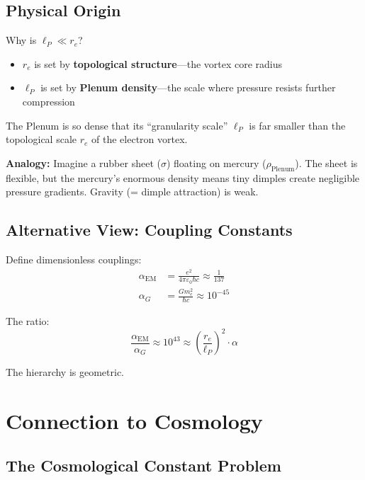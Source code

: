 \subsection{Physical Origin}

Why is $\ell_P \ll r_e$?

\begin{itemize}
    \item $r_e$ is set by \textbf{topological structure}—the vortex core radius
    \item $\ell_P$ is set by \textbf{Plenum density}—the scale where pressure resists further compression
\end{itemize}

The Plenum is so dense that its ``granularity scale'' $\ell_P$ is far smaller than the topological scale $r_e$ of the electron vortex.

\textbf{Analogy:} Imagine a rubber sheet ($\sigma$) floating on mercury ($\rho_{\text{Plenum}}$). The sheet is flexible, but the mercury's enormous density means tiny dimples create negligible pressure gradients. Gravity (= dimple attraction) is weak.

\subsection{Alternative View: Coupling Constants}

Define dimensionless couplings:
\begin{align}
\alpha_{\text{EM}} &= \frac{e^2}{4\pi\varepsilon_0 \hbar c} \approx \frac{1}{137} \\
\alpha_G &= \frac{G m_e^2}{\hbar c} \approx 10^{-45}
\end{align}

The ratio:
\begin{equation}
\frac{\alpha_{\text{EM}}}{\alpha_G} \approx 10^{43} \approx \left(\frac{r_e}{\ell_P}\right)^2 \cdot \alpha
\end{equation}

The hierarchy is geometric.

\newpage

\section{Connection to Cosmology}
\label{sec:cosmology}

\subsection{The Cosmological Constant Problem}

